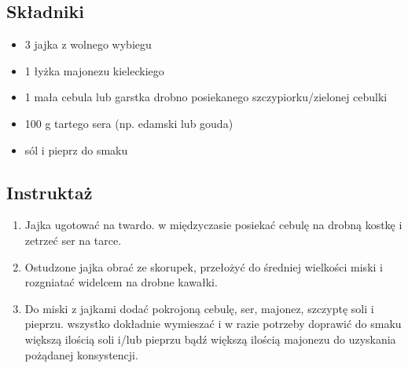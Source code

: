 \documentclass[a4paper,10pt]{book}
\begin{document}
\begin{multicols}{2}

\subsection*{Składniki}
\begin{itemize}
    \item 3 jajka z wolnego wybiegu
    \item 1 łyżka majonezu kieleckiego
    \item 1 mała cebula lub garstka drobno posiekanego szczypiorku/zielonej cebulki
    \item 100 g tartego sera (np. edamski lub gouda)
    \item sól i pieprz do smaku
\end{itemize}

\columnbreak

\begin{figure}[H]
    \centering
\end{figure}
\end{multicols}

\vspace{0.5cm} 

\subsection*{Instruktaż}
\begin{enumerate}
    \item Jajka ugotować na twardo. w międzyczasie posiekać cebulę na drobną kostkę i zetrzeć ser na tarce.
    \item Ostudzone jajka obrać ze skorupek, przełożyć do średniej wielkości miski i rozgniatać widelcem na drobne kawałki.
    \item Do miski z jajkami dodać pokrojoną cebulę, ser, majonez, szczyptę soli i pieprzu. wszystko dokładnie wymieszać i w razie potrzeby doprawić do smaku większą ilością soli i/lub pieprzu bądź większą ilością majonezu do uzyskania pożądanej konsystencji.
\end{enumerate}
\end{document}
